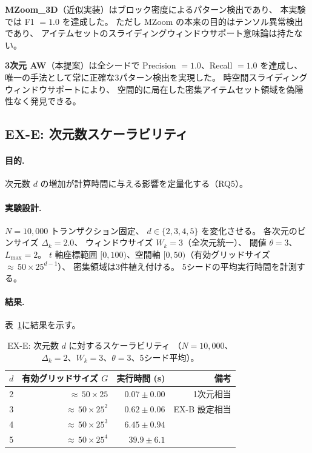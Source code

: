 \textbf{MZoom\_3D}（近似実装）はブロック密度によるパターン検出であり、
本実験では F1 $= 1.0$ を達成した。
ただし MZoom の本来の目的はテンソル異常検出であり、
アイテムセットのスライディングウィンドウサポート意味論は持たない。

\textbf{3次元 AW}（本提案）は全シードで Precision $= 1.0$、Recall $= 1.0$ を達成し、
唯一の手法として常に正確な3パターン検出を実現した。
時空間スライディングウィンドウサポートにより、
空間的に局在した密集アイテムセット領域を偽陽性なく発見できる。

\subsection{EX-E: 次元数スケーラビリティ}\label{sec:ex_e}

\paragraph{目的.}
次元数 $d$ の増加が計算時間に与える影響を定量化する（RQ5）。

\paragraph{実験設計.}
$N = 10{,}000$ トランザクション固定、
$d \in \{2, 3, 4, 5\}$ を変化させる。
各次元のビンサイズ $\Delta_k = 2.0$、
ウィンドウサイズ $W_k = 3$（全次元統一）、
閾値 $\theta = 3$、$L_{\max} = 2$。
$t$ 軸座標範囲 $[0, 100)$、空間軸 $[0, 50)$（有効グリッドサイズ
${\approx}\,50 \times 25^{d-1}$）、
密集領域は3件植え付ける。
5シードの平均実行時間を計測する。

\paragraph{結果.}
表~\ref{tab:ex_e}に結果を示す。

\begin{table}[t]
\centering
\caption{EX-E: 次元数 $d$ に対するスケーラビリティ
（$N{=}10{,}000$、$\Delta_k{=}2$、$W_k{=}3$、$\theta{=}3$、5シード平均）。}
\label{tab:ex_e}
\small
\begin{tabular}{rrrr}
\toprule
$d$ & 有効グリッドサイズ $G$ & 実行時間 (s) & 備考 \\
\midrule
2 & ${\approx}\,50 \times 25$       & $0.07 \pm 0.00$ & 1次元相当 \\
3 & ${\approx}\,50 \times 25^2$     & $0.62 \pm 0.06$ & EX-B 設定相当 \\
4 & ${\approx}\,50 \times 25^3$     & $6.45 \pm 0.94$ & \\
5 & ${\approx}\,50 \times 25^4$     & $39.9 \pm 6.1$ & \\
\bottomrule
\end{tabular}
\end{table}

